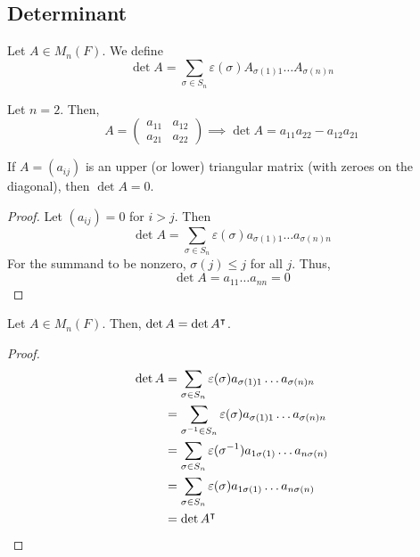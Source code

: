 \subsection{Determinant}
\begin{definition}
	Let \( A \in M_n(F) \).
	We define
	\[
		\det A = \sum_{\sigma \in S_n} \varepsilon(\sigma) A_{\sigma(1) 1} \dots A_{\sigma(n) n}
	\]
\end{definition}
\begin{example}
	Let \( n = 2 \).
	Then,
	\[
		A = \begin{pmatrix} a_{11} & a_{12} \\ a_{21} & a_{22} \end{pmatrix} \implies \det A = a_{11} a_{22} - a_{12} a_{21}
	\]
\end{example}
\begin{lemma}
	If \( A = (a_{ij}) \) is an upper (or lower) triangular matrix (with zeroes on the diagonal), then \( \det A = 0 \).
\end{lemma}
\begin{proof}
	Let \( (a_{ij}) = 0 \) for \( i > j \).
	Then
	\[
		\det A = \sum_{\sigma \in S_n} \varepsilon(\sigma) a_{\sigma(1) 1} \dots a_{\sigma(n) n}
	\]
	For the summand to be nonzero, \( \sigma(j) \leq j \) for all \( j \).
	Thus,
	\[
		\det A = a_{1 1} \dots a_{n n} = 0
	\]
\end{proof}
\begin{lemma}
	Let \( A \in M_n(F) \).
	Then, \( \det A = \det A^\intercal \).
\end{lemma}
\begin{proof}
	\begin{align*}
		\det A & = \sum_{\sigma \in S_n} \varepsilon(\sigma) a_{\sigma(1) 1} \dots a_{\sigma(n) n}      \\
		       & = \sum_{\sigma^{-1} \in S_n} \varepsilon(\sigma) a_{\sigma(1) 1} \dots a_{\sigma(n) n} \\
		       & = \sum_{\sigma \in S_n} \varepsilon(\sigma^{-1}) a_{1 \sigma(1)} \dots a_{n \sigma(n)} \\
		       & = \sum_{\sigma \in S_n} \varepsilon(\sigma) a_{1 \sigma(1)} \dots a_{n \sigma(n)}      \\
		       & = \det A^\intercal
	\end{align*}
\end{proof}

